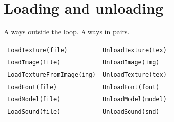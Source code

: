 \section{Loading and unloading}

Always outside the loop. Always in pairs.

\begin{center}
\begin{tabular}{@{}ll@{}}
\toprule
\lstinline|LoadTexture(file)| & \lstinline|UnloadTexture(tex)| \\
\lstinline|LoadImage(file)| & \lstinline|UnloadImage(img)| \\
\lstinline|LoadTextureFromImage(img)| & \lstinline|UnloadTexture(tex)| \\
\lstinline|LoadFont(file)| & \lstinline|UnloadFont(font)| \\
\lstinline|LoadModel(file)| & \lstinline|UnloadModel(model)| \\
\lstinline|LoadSound(file)| & \lstinline|UnloadSound(snd)| \\
\bottomrule
\end{tabular}
\end{center}
